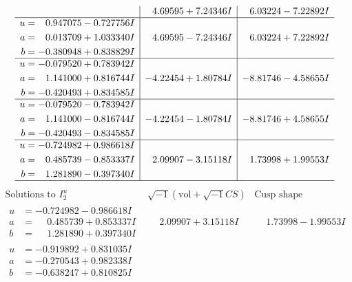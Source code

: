 \documentclass[1p]{elsarticle_modified}
\theoremstyle{definition}
\newcommand{\I}{\sqrt{-1}}
\begin{document}
$$\begin{array}{c|c|c}
 & \phantom{-}4.69595 + 7.24346 I & \phantom{-}6.03224 - 7.22892 I \\ \hline\begin{aligned}
u &= \phantom{-}0.947075 - 0.727756 I \\
a &= \phantom{-}0.013709 + 1.033340 I \\
b &= -0.380948 + 0.838829 I\end{aligned}
 & \phantom{-}4.69595 - 7.24346 I & \phantom{-}6.03224 + 7.22892 I \\ \hline\begin{aligned}
u &= -0.079520 + 0.783942 I \\
a &= \phantom{-}1.141000 + 0.816744 I \\
b &= -0.420493 + 0.834585 I\end{aligned}
 & -4.22454 + 1.80784 I & -8.81746 - 4.58655 I \\ \hline\begin{aligned}
u &= -0.079520 - 0.783942 I \\
a &= \phantom{-}1.141000 - 0.816744 I \\
b &= -0.420493 - 0.834585 I\end{aligned}
 & -4.22454 - 1.80784 I & -8.81746 + 4.58655 I \\ \hline\begin{aligned}
u &= -0.724982 + 0.986618 I \\
a &= \phantom{-}0.485739 - 0.853337 I \\
b &= \phantom{-}1.281890 - 0.397340 I\end{aligned}
 & \phantom{-}2.09907 - 3.15118 I & \phantom{-}1.73998 + 1.99553 I\\
 \hline 
 \end{array}$$\newpage$$\begin{array}{c|c|c}  
\text{Solutions to }I^u_{2}& \I (\text{vol} + \sqrt{-1}CS) & \text{Cusp shape}\\
 \hline 
\begin{aligned}
u &= -0.724982 - 0.986618 I \\
a &= \phantom{-}0.485739 + 0.853337 I \\
b &= \phantom{-}1.281890 + 0.397340 I\end{aligned}
 & \phantom{-}2.09907 + 3.15118 I & \phantom{-}1.73998 - 1.99553 I \\ \hline\begin{aligned}
u &= -0.919892 + 0.831035 I \\
a &= -0.270543 + 0.982338 I \\
b &= -0.638247 + 0.810825 I\end{aligned}

\end{array}$$
\end{document}
